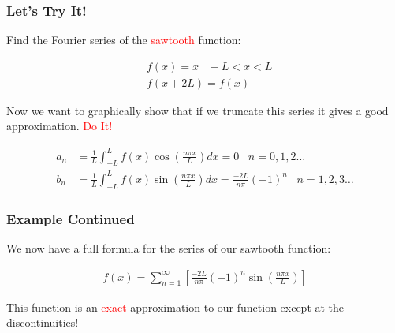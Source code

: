 \documentclass[serif]{beamer}
\begin{document}

\begin{frame}
\frametitle{Let's Try It!} 

Find the Fourier series of the \textcolor{red}{sawtooth} function: 

\begin{align*}
&f(x) = x \; \; \;  -L < x < L \\
&f(x+2L) = f(x)
\end{align*}


Now we want to graphically show that if we truncate this series it gives a good approximation.  \textcolor{red}{Do It!} 

\pause

\begin{align*}
a_n &= \frac{1}{L} \int^{L}_{-L} f(x)\cos \left(\frac{n\pi x}{L}\right) dx = 0 \;\;\; n=0,1,2\hdots \\
b_n &= \frac{1}{L} \int^{L}_{-L} f(x)\sin \left(\frac{n\pi x}{L}\right) dx  = \frac{-2L}{n\pi}(-1)^n \;\;\; n=1,2,3\hdots
\end{align*}


\end{frame}

\begin{frame}
\frametitle{Example Continued} 

We now have a full formula for the series of our sawtooth function: 

\begin{align*}
f(x) =\sum^{\infty}_{n=1}\left[ \frac{-2L}{n\pi}(-1)^n\sin\left(\frac{n\pi x}{L}\right)\right]
\end{align*}

This function is an \textcolor{red}{exact} approximation to our function except at the discontinuities! 

\end{frame}
\end{document}
